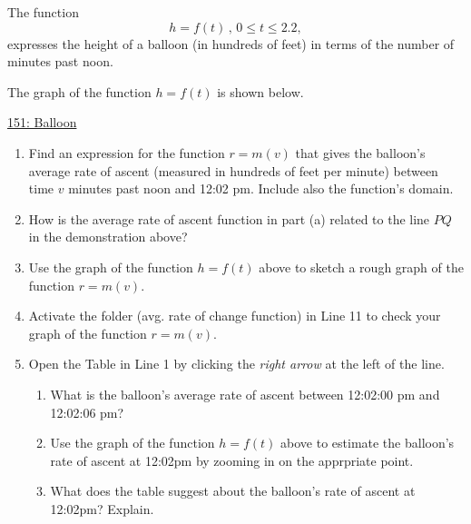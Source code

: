 \documentclass{ximera}
\begin{document}
\begin{question}  \label{Q4ghg5t4t4tr4}
The function
\[
      h = f(t)  \, , \, 0\leq t \leq 2.2 ,                     %
\]
expresses the height of a balloon (in hundreds of feet) in terms of the number of minutes past noon.

The graph of the function $h=f(t)$ is shown below.

\begin{onlineOnly}
    \begin{center}
\end{center}
\end{onlineOnly}

\href{https://www.desmos.com/calculator/kovtjpsebu}{151: Balloon}

\begin{enumerate}

\item Find an expression for the function $r=m(v)$ that gives the balloon's average rate of ascent (measured in hundreds of feet per minute) between time $v$ minutes past noon and 12:02 pm. Include also the function's domain.

\item How is the average rate of ascent function in part (a) related to the line $PQ$ in the demonstration above?

\item Use the graph of the function $h=f(t)$ above to sketch a rough graph of the function $r=m(v)$.

\item Activate the folder (avg. rate of change function) in Line 11 to check your graph of the function $r=m(v)$. 

\item Open the Table in Line 1 by clicking the \emph{right arrow} at the left of the line. 

\begin{enumerate}
\item What is the balloon's average rate of ascent between 12:02:00 pm and 12:02:06 pm?

\item Use the graph of the function $h=f(t)$ above to estimate the balloon's rate of ascent at 12:02pm by zooming in on the apprpriate point.

\item What does the table suggest about the balloon's rate of ascent at 12:02pm? Explain.
\end{enumerate}


\end{enumerate}
\end{question}
\end{document}

